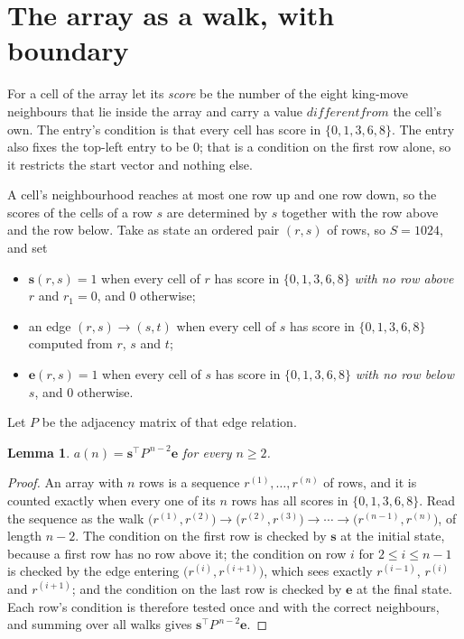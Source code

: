 \documentclass[11pt,a4paper]{article}
\theoremstyle{plain}
\newtheorem{lemma}[theorem]{Lemma}
\theoremstyle{definition}
\begin{document}
\section{The array as a walk, with boundary}

For a cell of the array let its \emph{score} be the number of the eight king-move neighbours that lie inside
the array and carry a value $different from$ the cell's own. The entry's condition is that every cell
has score in $\{0,1,3,6,8\}$. The entry also fixes the top-left entry to be $0$; that is a condition on the first row alone, so it restricts the start vector and nothing else.

A cell's neighbourhood reaches at most one row up and one row down, so the scores of the
cells of a row $s$ are determined by $s$ together with the row above and the row below.
Take as state an ordered pair $(r,s)$ of rows, so $S=1024$, and set
\begin{itemize}
\item $\mathbf{s}(r,s)=1$ when every cell of $r$ has score in $\{0,1,3,6,8\}$ \emph{with no row
above $r$} and $r_1=0$, and $0$ otherwise;
\item an edge $(r,s)\to(s,t)$ when every cell of $s$ has score in $\{0,1,3,6,8\}$ computed from
$r$, $s$ and $t$;
\item $\mathbf{e}(r,s)=1$ when every cell of $s$ has score in $\{0,1,3,6,8\}$ \emph{with no row
below $s$}, and $0$ otherwise.
\end{itemize}
Let $P$ be the adjacency matrix of that edge relation.

\begin{lemma}\label{lem:walk}
$a(n)=\mathbf{s}^{\!\top}P^{\,n-2}\mathbf{e}$ for every $n\ge2$.
\end{lemma}

\begin{proof}
An array with $n$ rows is a sequence $r^{(1)},\dots,r^{(n)}$ of rows, and it is counted
exactly when every one of its $n$ rows has all scores in $\{0,1,3,6,8\}$. Read the sequence as the
walk $\bigl(r^{(1)},r^{(2)}\bigr)\to\bigl(r^{(2)},r^{(3)}\bigr)\to\cdots\to
\bigl(r^{(n-1)},r^{(n)}\bigr)$, of length $n-2$. The condition on the first row is
checked by $\mathbf{s}$ at the initial state, because a first row has no row above it; the
condition on row $i$ for $2\le i\le n-1$ is checked by the edge entering
$\bigl(r^{(i)},r^{(i+1)}\bigr)$, which sees exactly $r^{(i-1)}$, $r^{(i)}$ and
$r^{(i+1)}$; and the condition on the last row is checked by $\mathbf{e}$ at the final
state. Each row's condition is therefore tested once and with the correct neighbours, and
summing over all walks gives $\mathbf{s}^{\!\top}P^{\,n-2}\mathbf{e}$.
\end{proof}
\end{document}
